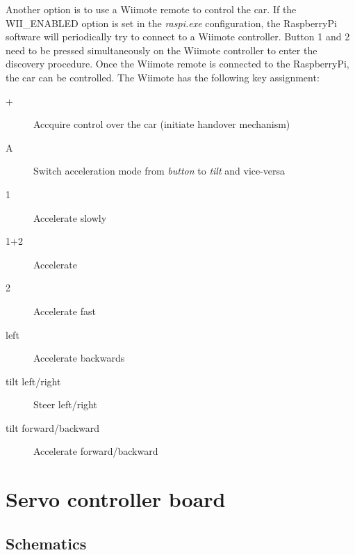 \documentclass[a4paper
               ,10pt
               ,DIV=10 %
               ,BCOR=0.3cm
               ,pagesize %
               ,headings=small
               ,bibtotoc
               ]
               {scrartcl}
\begin{document}
Another option is to use a Wiimote remote to control the car. If the WII\_ENABLED option is set in the \textit{raspi.exe} configuration, the RaspberryPi software will periodically try to connect to a Wiimote controller.
Button 1 and 2 need to be pressed simultaneously on the Wiimote controller to enter the discovery procedure.
Once the Wiimote remote is connected to the RaspberryPi, the car can be controlled.
The Wiimote has the following key assignment:
\begin{description}
\item[+] Accquire control over the car (initiate handover mechanism)
\item[A] Switch acceleration mode from \textit{button} to \textit{tilt} and vice-versa
\item[1] Accelerate slowly
\item[1+2] Accelerate
\item[2] Accelerate fast
\item[left] Accelerate backwards
\item[tilt left/right] Steer left/right
\item[tilt forward/backward] Accelerate forward/backward
\end{description}

\section{Servo controller board}

\subsection{Schematics}
\end{document}
